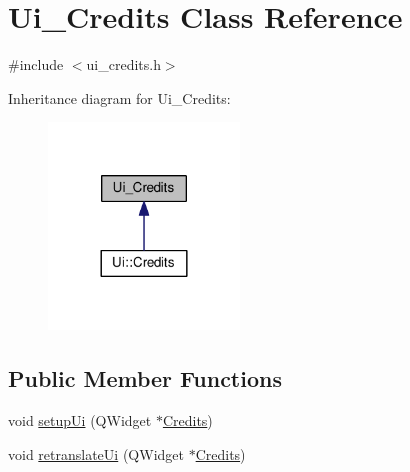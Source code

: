 \hypertarget{classUi__Credits}{\section{Ui\-\_\-\-Credits Class Reference}
\label{classUi__Credits}
}


{\ttfamily \#include $<$ui\-\_\-credits.\-h$>$}



Inheritance diagram for Ui\-\_\-\-Credits\-:\nopagebreak
\begin{figure}[H]
\begin{center}
\leavevmode
\includegraphics[width=144pt]{classUi__Credits__inherit__graph}
\end{center}
\end{figure}
\subsection*{Public Member Functions}
\begin{DoxyCompactItemize}
\item 
void \hyperlink{classUi__Credits_a6bfca1eceb04ccf96dac510645927d75}{setup\-Ui} (Q\-Widget $\ast$\hyperlink{classCredits}{Credits})
\item 
void \hyperlink{classUi__Credits_a56009ef93e216786c8386b062eeb5a92}{retranslate\-Ui} (Q\-Widget $\ast$\hyperlink{classCredits}{Credits})
\end{DoxyCompactItemize}
